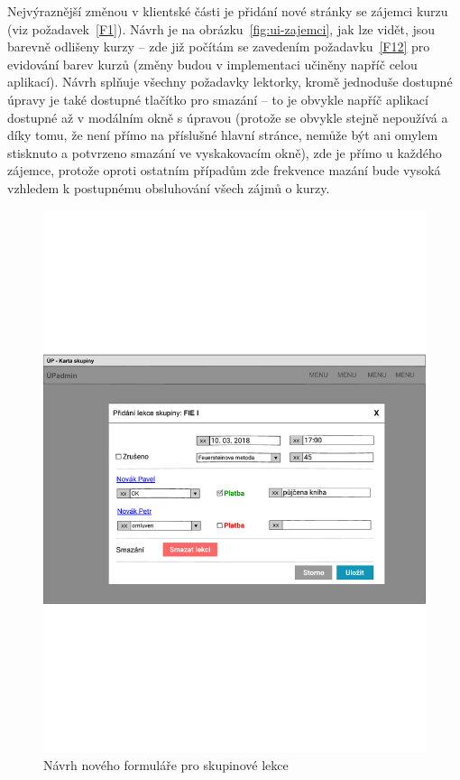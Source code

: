 Nejvýraznější změnou v klientské části je přidání nové stránky se zájemci kurzu (viz požadavek~\ref{F1}). Návrh je na obrázku~\ref{fig:ui-zajemci}, jak lze vidět, jsou barevně odlišeny kurzy -- zde již počítám se zavedením požadavku~\ref{F12} pro evidování barev kurzů (změny budou v implementaci učiněny napříč celou aplikací). Návrh splňuje všechny požadavky lektorky, kromě jednoduše dostupné úpravy je také dostupné tlačítko pro smazání -- to je obvykle napříč aplikací dostupné až v modálním okně s úpravou (protože se obvykle stejně nepoužívá a díky tomu, že není přímo na příslušné hlavní stránce, nemůže být ani omylem stisknuto a potvrzeno smazání ve vyskakovacím okně), zde je přímo u každého zájemce, protože oproti ostatním případům zde frekvence mazání bude vysoká vzhledem k postupnému obsluhování všech zájmů o kurzy.

\begin{figure}\centering
    \includegraphics[width=1\textwidth]{img/ui-lekce-skupina}
    \caption{Návrh nového formuláře pro skupinové lekce}\label{fig:ui-lekce-skupina}
\end{figure}

